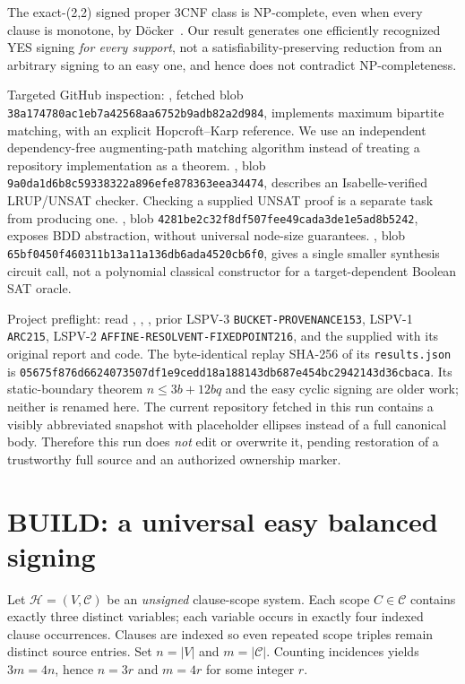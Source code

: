 \documentclass[11pt]{article}
\begin{document}
The exact-(2,2) signed proper 3CNF class is NP-complete, even when every clause is monotone, by D\"ocker~\cite{docker}. Our result generates one efficiently recognized YES signing \emph{for every support}, not a satisfiability-preserving reduction from an arbitrary signing to an easy one, and hence does not contradict NP-completeness.

Targeted GitHub inspection: , fetched blob \texttt{38a174780ac1eb7a42568aa6752b9adb82a2d984}, implements maximum bipartite matching, with an explicit Hopcroft--Karp reference. We use an independent dependency-free augmenting-path matching algorithm instead of treating a repository implementation as a theorem. , blob \texttt{9a0da1d6b8c59338322a896efe878363eea34474}, describes an Isabelle-verified LRUP/UNSAT checker. Checking a supplied UNSAT proof is a separate task from producing one. , blob \texttt{4281be2c32f8df507fee49cada3de1e5ad8b5242}, exposes BDD abstraction, without universal node-size guarantees. , blob \texttt{65bf0450f460311b13a11a136db6ada4520cb6f0}, gives a single smaller synthesis circuit call, not a polynomial classical constructor for a target-dependent Boolean SAT oracle.

Project preflight: read , , , prior LSPV-3 \texttt{BUCKET-PROVENANCE153}, LSPV-1 \texttt{ARC215}, LSPV-2 \texttt{AFFINE-RESOLVENT-FIXEDPOINT216}, and the supplied  with its original report and code. The byte-identical replay SHA-256 of its \texttt{results.json} is \texttt{05675f876d6624073507df1e9cedd18a188143db687e454bc2942143d36cbaca}. Its static-boundary theorem $n\le3b+12bq$ and the easy cyclic signing are older work; neither is renamed here. The current repository  fetched in this run contains a visibly abbreviated snapshot with placeholder ellipses instead of a full canonical body. Therefore this run does \emph{not} edit or overwrite it, pending restoration of a trustworthy full source and an authorized ownership marker.

\section{BUILD: a universal easy balanced signing}
Let $\mathcal H=(V,\mathcal C)$ be an \emph{unsigned} clause-scope system. Each scope $C\in\mathcal C$ contains exactly three distinct variables; each variable occurs in exactly four indexed clause occurrences. Clauses are indexed so even repeated scope triples remain distinct source entries. Set $n=|V|$ and $m=|\mathcal C|$. Counting incidences yields $3m=4n$, hence $n=3r$ and $m=4r$ for some integer $r$.
\end{document}
